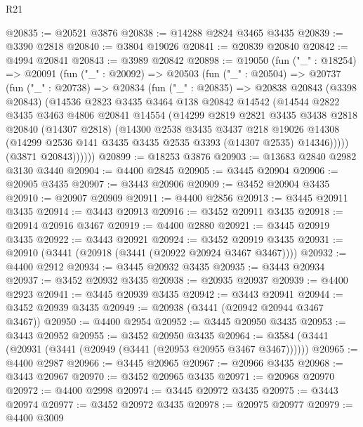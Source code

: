 \begin{lexlean}{R21}
\begin{coremodule}
@20835 := @20521 @3876
@20838 := @14288 @2824 @3465 @3435
@20839 := @3390 @2818
@20840 := @3804 @19026
@20841 := @20839 @20840
@20842 := @4994 @20841
@20843 := @3989 @20842
@20898 := @19050
    (fun ("_" : @18254) =>
    @20091
      (fun ("_" : @20092) =>
      @20503
        (fun ("_" : @20504) =>
        @20737
          (fun ("_" : @20738) =>
          @20834
            (fun ("_" : @20835) =>
            @20838
              @20843
              (@3398 @20843)
              (@14536
                @2823
                @3435
                @3464
                @138
                @20842
                @14542
                (@14544
                  @2822
                  @3435
                  @3463
                  @4806
                  @20841
                  @14554
                  (@14299
                    @2819
                    @2821
                    @3435
                    @3438
                    @2818
                    @20840
                    (@14307 @2818)
                    (@14300
                      @2538
                      @3435
                      @3437
                      @218
                      @19026
                      @14308
                      (@14299 @2536 @141 @3435 @3435 @2535 @3393 (@14307 @2535) @14346)))))
              (@3871 @20843))))))
@20899 := @18253 @3876
@20903 := @13683 @2840 @2982 @3130 @3440
@20904 := @4400 @2845
@20905 := @3445 @20904
@20906 := @20905 @3435
@20907 := @3443 @20906
@20909 := @3452 @20904 @3435
@20910 := @20907 @20909
@20911 := @4400 @2856
@20913 := @3445 @20911 @3435
@20914 := @3443 @20913
@20916 := @3452 @20911 @3435
@20918 := @20914 @20916 @3467
@20919 := @4400 @2880
@20921 := @3445 @20919 @3435
@20922 := @3443 @20921
@20924 := @3452 @20919 @3435
@20931 := @20910 (@3441 (@20918 (@3441 (@20922 @20924 @3467 @3467))))
@20932 := @4400 @2912
@20934 := @3445 @20932 @3435
@20935 := @3443 @20934
@20937 := @3452 @20932 @3435
@20938 := @20935 @20937
@20939 := @4400 @2923
@20941 := @3445 @20939 @3435
@20942 := @3443 @20941
@20944 := @3452 @20939 @3435
@20949 := @20938 (@3441 (@20942 @20944 @3467 @3467))
@20950 := @4400 @2954
@20952 := @3445 @20950 @3435
@20953 := @3443 @20952
@20955 := @3452 @20950 @3435
@20964 := @3584 (@3441 (@20931 (@3441 (@20949 (@3441 (@20953 @20955 @3467 @3467))))))
@20965 := @4400 @2987
@20966 := @3445 @20965
@20967 := @20966 @3435
@20968 := @3443 @20967
@20970 := @3452 @20965 @3435
@20971 := @20968 @20970
@20972 := @4400 @2998
@20974 := @3445 @20972 @3435
@20975 := @3443 @20974
@20977 := @3452 @20972 @3435
@20978 := @20975 @20977
@20979 := @4400 @3009

\end{coremodule}
\end{lexlean}

